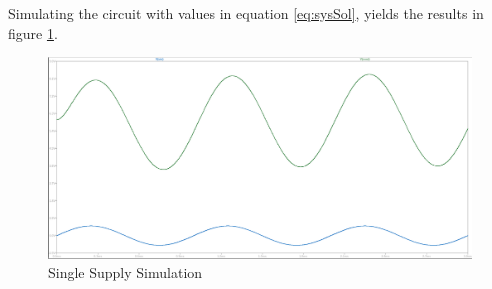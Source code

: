 Simulating the circuit with values in equation \ref{eq:sysSol}, yields the results in figure \ref{fig:SingSupSim}.

\begin{figure}[H]
    \centering
    \includegraphics*[scale = 0.25]{Images/SingSupSim.png}
    \caption{Single Supply Simulation}
    \label{fig:SingSupSim}
\end{figure}
